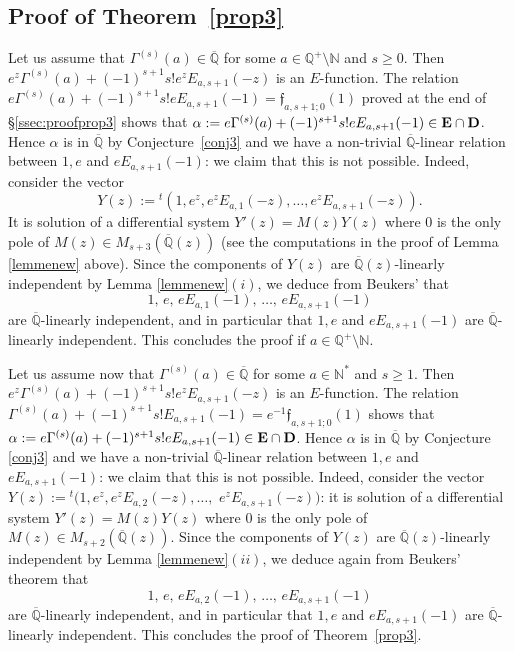 \documentclass[reqno,12pt]{article}
\numberwithin{equation}{section}
\theoremstyle{remark}
\newcommand{\Qbar}{\overline{\mathbb Q}}
\newcommand{\EE}{{\bf E}}
\newcommand{\fgo}{\mathfrak{f}}
\begin{document}
\subsection{Proof of Theorem~\ref{prop3}} \label{subsec43}


 Let us assume that $\Gamma^{(s)}(a) \in \Qbar$ for some $a\in \mathbb Q^+\setminus \mathbb N$ and $s\ge 0$. Then $e^z\Gamma^{(s)}(a)+(-1)^{s+1} s! e^zE_{a,s+1}(-z)$ is an $E$-function. The relation $e\Gamma^{(s)}(a)+(-1)^{s+1} s!  eE_{a,s+1}(-1)=\fgo_{a,s+1;0}(1)$ proved at the end of \S \ref{ssec:proofprop3} shows that $\alpha:=e\Gamma^{(s)}(a)+(-1)^{s+1} s! eE_{a,s+1}(-1)\in \EE \cap {\bf D}$. Hence $\alpha$ is in $\Qbar$ by Conjecture~\ref{conj3} and we have a non-trivial $\Qbar$-linear relation between $1, e$ and $eE_{a,s+1}(-1)$: we claim that this is not possible. Indeed, consider the vector $$Y(z):={}^t(1, e^z, e^zE_{a,1}(-z), \ldots, e^zE_{a,s+1}(-z)).$$ 
It is solution of a differential system $Y'(z)=M(z)Y(z)$ where 0 is the only pole of $M(z)\in M_{s+3}(\Qbar(z))$ (see the computations in the proof of Lemma \ref{lemmenew} above). Since the components of $Y(z)$ are $\Qbar(z)$-linearly independent by Lemma \ref{lemmenew}$(i)$, we deduce from Beukers' \cite[Corollary 1.4]{beukers} that $$1,\, e, \, eE_{a,1}(-1),\, \ldots, \,eE_{a,s+1}(-1)$$ are $\Qbar$-linearly independent, and in particular that $1, e$ and $eE_{a,s+1}(-1)$ are $\Qbar$-linearly independent. This concludes the proof if $a\in \mathbb Q^+\setminus \mathbb N$.

\medskip

Let us assume now  that $\Gamma^{(s)}(a)\in \Qbar$  for some $a\in \mathbb N^*$ and $s\ge 1$.  Then $e^z\Gamma^{(s)}(a)+(-1)^{s+1} s! e^zE_{a,s+1}(-z)$ is an $E$-function. The relation $\Gamma^{(s)}(a)+(-1)^{s+1} s! E_{a,s+1}(-1)=e^{-1}\fgo_{a,s+1;0}(1)$ shows that $\alpha:=e\Gamma^{(s)}(a)+(-1)^{s+1} s!e E_{a,s+1}(-1)\in \EE \cap {\bf D}$. Hence $\alpha$ is in $\Qbar$ by Conjecture \ref{conj3} and we have a non-trivial $\Qbar$-linear relation between $1, e$ and $eE_{a,s+1}(-1)$: we claim that this is not possible. Indeed, consider the vector $Y(z):={}^t(1, e^z, e^zE_{a,2}(-z), \ldots,$ $e^zE_{a,s+1}(-z))$: it is solution of a  differential system $Y'(z)=M(z)Y(z)$ where 0 is the only pole of $M(z)\in M_{s+2}(\Qbar(z))$. Since the components of $Y(z)$ are $\Qbar(z)$-linearly independent by Lemma \ref{lemmenew}$(ii)$, we deduce again from Beukers' theorem that $$1, \,e, \, eE_{a,2}(-1), \,\ldots, \, eE_{a,s+1}(-1)$$ are $\Qbar$-linearly independent, and in particular that $1, e$ and $eE_{a,s+1}(-1)$ are $\Qbar$-linearly independent.  This concludes the proof of Theorem~\ref{prop3}.
 
\end{document}
